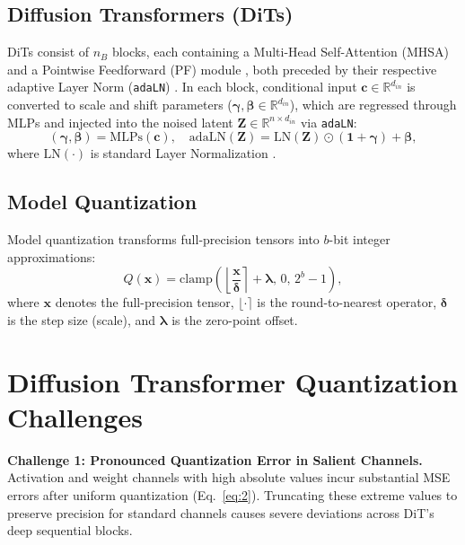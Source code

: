 \documentclass[10pt,a4paper]{article}
\begin{document}
\subsection{Diffusion Transformers (DiTs)}

DiTs consist of $n_B$ blocks, each containing a Multi-Head Self-Attention (MHSA) and a Pointwise Feedforward (PF) module \cite{vaswani2017attention,dosovitskiy2021image,peebles2023scalable}, both preceded by their respective adaptive Layer Norm (\texttt{adaLN}) \cite{perez2018film}. In each block, conditional input $\mathbf{c} \in \mathbb{R}^{d_{in}}$ is converted to scale and shift parameters ($\boldsymbol{\gamma}, \boldsymbol{\beta} \in \mathbb{R}^{d_{in}}$), which are regressed through MLPs and injected into the noised latent $\mathbf{Z} \in \mathbb{R}^{n \times d_{in}}$ via \texttt{adaLN}:
\begin{equation}
(\boldsymbol{\gamma}, \boldsymbol{\beta}) = \mathrm{MLPs}(\mathbf{c}), \quad \mathrm{adaLN}(\mathbf{Z}) = \mathrm{LN}(\mathbf{Z}) \odot (\mathbf{1} + \boldsymbol{\gamma}) + \boldsymbol{\beta},
\label{eq:1}
\end{equation}
where $\mathrm{LN}(\cdot)$ is standard Layer Normalization \cite{ba2016layer}.

\subsection{Model Quantization}

Model quantization transforms full-precision tensors into $b$-bit integer approximations:
\begin{equation}
Q(\mathbf{x}) = \mathrm{clamp}\!\left(\left\lfloor \frac{\mathbf{x}}{\boldsymbol{\delta}} \right\rceil + \boldsymbol{\lambda},\, 0,\, 2^b - 1\right),
\label{eq:2}
\end{equation}
where $\mathbf{x}$ denotes the full-precision tensor, $\lfloor \cdot \rceil$ is the round-to-nearest operator, $\boldsymbol{\delta}$ is the step size (scale), and $\boldsymbol{\lambda}$ is the zero-point offset.

\section{Diffusion Transformer Quantization Challenges}

\textbf{Challenge 1: Pronounced Quantization Error in Salient Channels.} Activation and weight channels with high absolute values incur substantial MSE errors after uniform quantization (Eq.~\ref{eq:2}). Truncating these extreme values to preserve precision for standard channels causes severe deviations across DiT's deep sequential blocks.
\end{document}
